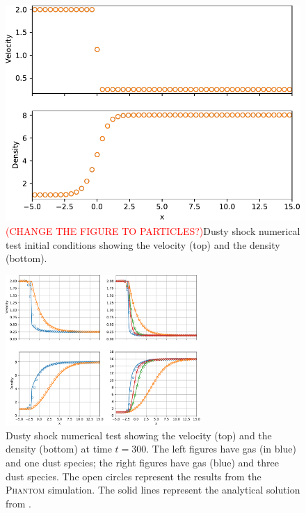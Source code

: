 \documentclass[fleqn,usenatbib]{mnras}
\begin{document}
\begin{figure}
   \begin{center}
      \includegraphics[width=\columnwidth]{figs/dustyshock_initial.pdf}
      \caption{\textcolor{red}{(CHANGE THE FIGURE TO PARTICLES?)}Dusty shock numerical test
         initial conditions showing the velocity (top) and the density
         (bottom).\label{fig:dustyshock_initial}}
   \end{center}
\end{figure}

\begin{figure}
   \begin{center}
      \includegraphics[width=0.66\textwidth]{figs/dustyshock_velocity_density.pdf}
      \caption{Dusty shock numerical test showing the velocity (top) and the
         density (bottom) at time \(t=300\). The left figures have gas (in blue)
         and one dust species; the right figures have gas (blue) and three dust
         species. The open circles represent the results from the
         \textsc{Phantom} simulation. The solid lines represent the analytical
         solution from \citet{Benitez-Llambay2019ApJS..241...25B}.%
         \label{fig:dustyshock_final}}
   \end{center}
\end{figure}
\end{document}
